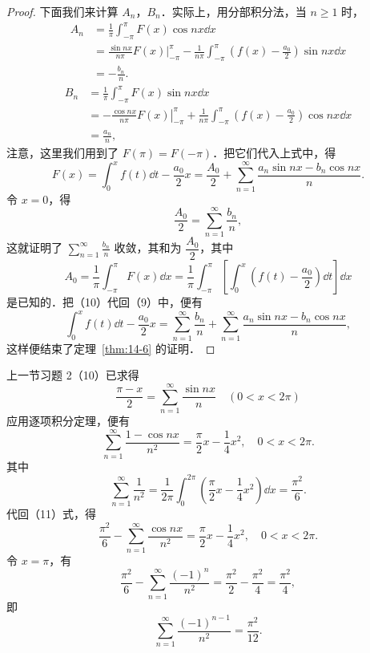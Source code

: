 \begin{proof}
下面我们来计算 $A_{n}$，$B_{n}$．实际上，用分部积分法，当 $n\geqslant 1$ 时，
\[
\begin{aligned}
A_{n}&=\frac{1}{\pi}\int_{-\pi}^{\pi}F(x)\cos nx\dd x\\
&=\frac{\sin nx}{n\pi}F(x)\bigg|_{-\pi}^{\pi}-\frac{1}{n\pi}\int_{-\pi}^{\pi}\left(f(x)-\frac{a_{0}}{2}\right)\sin nx\dd x\\
&=-\frac{b_{n}}{n}.
\end{aligned}
\]
\[
\begin{aligned}
B_{n}&=\frac{1}{\pi}\int_{-\pi}^{\pi}F(x)\sin nx\dd x\\
&=-\left.\frac{\cos nx}{n\pi}F(x)\right|_{-\pi}^{\pi}+\frac{1}{n\pi}\int_{-\pi}^{\pi}\left(f(x)-\frac{a_{0}}{2}\right)\cos nx\dd x\\
&=\frac{a_{n}}{n},
\end{aligned}
\]
注意，这里我们用到了 $F(\pi)=F(-\pi)$．把它们代入上式中，得
\begin{equation}
F(x)=\int_{0}^{x}f(t)\dd t-\frac{a_{0}}{2}x=\frac{A_{0}}{2}+\sum_{n=1}^{\infty}\frac{a_{n}\sin nx-b_{n}\cos nx}{n}.
\tag{9}
\end{equation}
令 $x=0$，得
\begin{equation}
\frac{A_{0}}{2}=\sum_{n=1}^{\infty}\frac{b_{n}}{n},
\tag{10}
\end{equation}
这就证明了 $\displaystyle\sum_{n=1}^{\infty}\frac{b_{n}}{n}$ 收敛，其和为 $\dfrac{A_{0}}{2}$，其中
\[
A_{0}=\frac{1}{\pi}\int_{-\pi}^{\pi}F(x)\dd x=\frac{1}{\pi}\int_{-\pi}^{\pi}\left[\int_{0}^{x}\left(f(t)-\frac{a_{0}}{2}\right)\dd t\right]\dd x
\]
是已知的．把（10）代回（9）中，便有
\[
\int_{0}^{x}f(t)\dd t-\frac{a_{0}}{2}x=\sum_{n=1}^{\infty}\frac{b_{n}}{n}+\sum_{n=1}^{\infty}\frac{a_{n}\sin nx-b_{n}\cos nx}{n},
\]
这样便结束了定理~\ref{thm:14-6} 的证明．
\end{proof}

\begin{example}\label{ex:14-2-6}
上一节习题 2（10）已求得
\[
\frac{\pi-x}{2}=\sum_{n=1}^{\infty}\frac{\sin nx}{n}\quad(0<x<2\pi)
\]
应用逐项积分定理，便有
\begin{equation}
\sum_{n=1}^{\infty}\frac{1-\cos nx}{n^{2}}=\frac{\pi}{2}x-\frac{1}{4}x^{2},\quad 0<x<2\pi.
\tag{11}
\end{equation}
其中
\begin{equation}
\sum_{n=1}^{\infty}\frac{1}{n^{2}}=\frac{1}{2\pi}\int_{0}^{2\pi}\left(\frac{\pi}{2}x-\frac{1}{4}x^{2}\right)\dd x=\frac{\pi^{2}}{6}.
\tag{12}
\end{equation}
代回（11）式，得
\[
\frac{\pi^{2}}{6}-\sum_{n=1}^{\infty}\frac{\cos nx}{n^{2}}=\frac{\pi}{2}x-\frac{1}{4}x^{2},\quad 0<x<2\pi.
\]
令 $x=\pi$，有
\[
\frac{\pi^{2}}{6}-\sum_{n=1}^{\infty}\frac{(-1)^{n}}{n^{2}}=\frac{\pi^{2}}{2}-\frac{\pi^{2}}{4}=\frac{\pi^{2}}{4},
\]
即
\begin{equation}
\sum_{n=1}^{\infty}\frac{(-1)^{n-1}}{n^{2}}=\frac{\pi^{2}}{12}.
\tag{13}
\end{equation}
\end{example}

